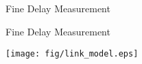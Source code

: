 \documentclass[compress,red]{beamer}
\begin{document}
\subsection{}
% 
% 
% 
\logo{}
\begin{frame}{Fine Delay Measurement}


\end{frame}
\begin{frame}{Fine Delay Measurement}

  \begin{center}
  \texttt{[image: fig/link\_model.eps]}
  \end{center}

\end{frame}
\end{document}
